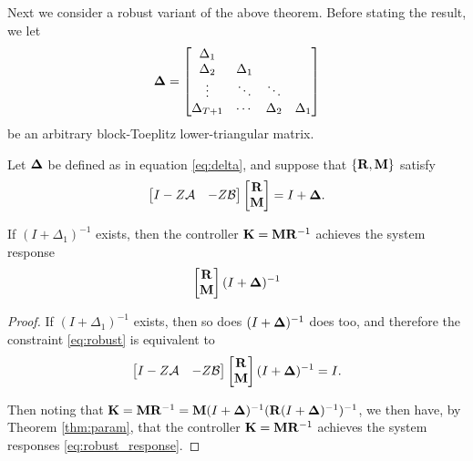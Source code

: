 \documentclass[11pt]{article}
\numberwithin{equation}{section}
\begin{document}
Next we consider a robust variant of the above theorem.  Before stating the result, we let
\begin{equation}
\mathbf{\Delta} = \begin{bmatrix} \Delta_1 & & & \\ \Delta_2 & \Delta_1 & & \\ \vdots & \ddots & \ddots & \\  \Delta_{T+1} & \cdots & \Delta_2 & \Delta_1 \end{bmatrix}
\label{eq:delta}
\end{equation}
be an arbitrary block-Toeplitz lower-triangular matrix.

\begin{theorem}
Let $\mathbf{\Delta}$ be defined as in equation \eqref{eq:delta}, and suppose that  $\{\mathbf{R}, \mathbf{M}\}$ satisfy
\begin{equation}
\begin{bmatrix}I - Z\mathcal{A} & -Z\mathcal{B} \end{bmatrix}\begin{bmatrix} \mathbf{R} \\ \mathbf{M} \end{bmatrix} = I + \mathbf{\Delta}.
\label{eq:robust}
\end{equation}

If $(I+\Delta_1)^{-1}$ exists, then the controller $\mathbf{K} = \mathbf{M} \mathbf{R}^{-1}$ achieves the system response
\begin{equation}
\begin{bmatrix}
\mathbf{R} \\ \mathbf{M} \end{bmatrix} (I + \mathbf{\Delta})^{-1}
\label{eq:robust_response}
\end{equation}
\end{theorem}
\begin{proof}
If $(I+\Delta_1)^{-1}$ exists, then so does $(I + \mathbf{\Delta})^{-1}$ does too, and therefore the constraint \eqref{eq:robust} is equivalent to
\begin{equation}
\begin{bmatrix}I - Z\mathcal{A} & -Z\mathcal{B} \end{bmatrix}\begin{bmatrix} \mathbf{R} \\ \mathbf{M} \end{bmatrix}(I + \mathbf{\Delta})^{-1} = I.
\end{equation}

Then noting that $\mathbf{K} = \mathbf{M} \mathbf{R}^{-1} = \mathbf{M} (I + \mathbf{\Delta})^{-1} (\mathbf{R} (I + \mathbf{\Delta})^{-1})^{-1} $, we then have, by Theorem \ref{thm:param}, that the controller $\mathbf{K} =  \mathbf{M} \mathbf{R}^{-1} $ achieves the system responses \eqref{eq:robust_response}.
\end{proof}
\end{document}
